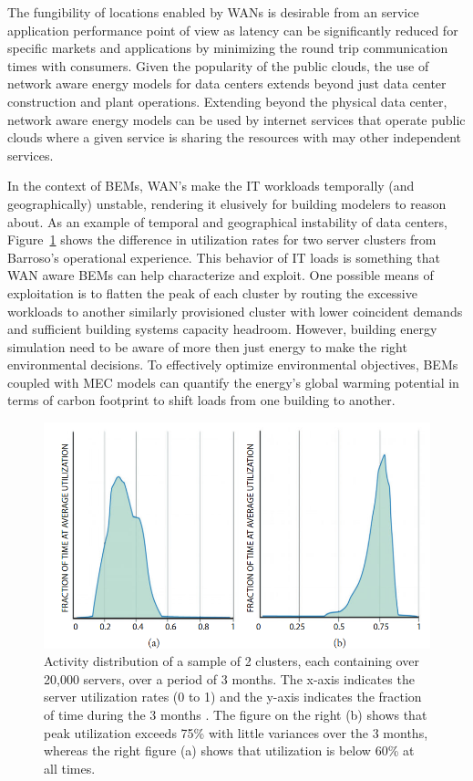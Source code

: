 The fungibility of locations enabled by WANs is desirable from an service application performance point of view as latency can be significantly reduced for specific markets and applications by minimizing the round trip communication times with consumers. Given the popularity of the public clouds, the use of network aware energy models for data centers extends beyond just data center construction and plant operations. Extending beyond the physical data center, network aware energy models can be used by internet services that operate public clouds where a given service is sharing the resources with may other independent services.    

In the context of BEMs, WAN's make the IT workloads temporally (and geographically) unstable, rendering it elusively for building modelers to reason about. As an example of temporal and geographical instability of data centers, Figure~\ref{fig:google_activity_dist} \citep{barroso18} shows the difference in utilization rates for two server clusters from Barroso's operational experience. This behavior of IT loads is something that WAN aware BEMs can help characterize and exploit. One possible means of exploitation is to flatten the peak of each cluster by routing the excessive workloads to another similarly provisioned cluster with lower coincident demands and sufficient building systems capacity headroom. However, building energy simulation need to be aware of more then just energy to make the right environmental decisions. To effectively optimize environmental objectives, BEMs coupled with MEC models can quantify the energy's global warming potential in terms of carbon footprint to shift loads from one building to another.

  \begin{figure}
    \centering
    \includegraphics[scale=.2]{marginal_energy_cost/img/google_activity_dist.png}
    \caption[Usage profiles of two production DC Clusters]{Activity distribution of a sample of 2 clusters, each containing over 20,000 servers, over a period of 3 months. The x-axis indicates the server utilization rates (0 to 1) and the y-axis indicates the fraction of time during the 3 months \citep{barroso18}. The figure on the right (b) shows that peak utilization exceeds 75\% with little variances over the 3 months, whereas the right figure (a) shows that utilization is below 60\% at all times.}
    \label{fig:google_activity_dist}
    \end{figure}

